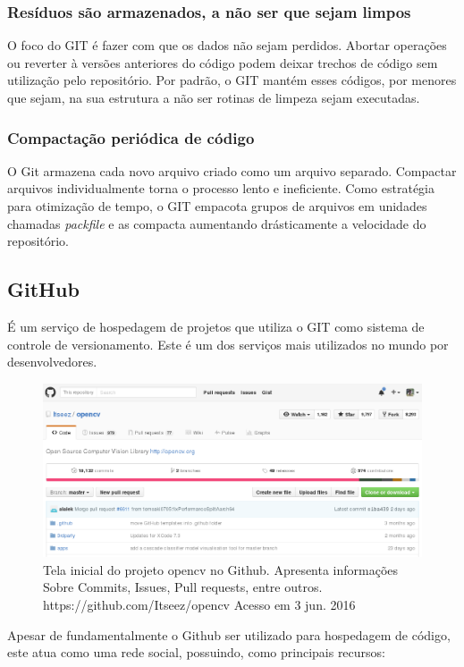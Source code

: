 \documentclass[
	article,			%
	12pt,				%
	oneside,			%
	a4paper,			%
	english,			
	brazil,
	sumario=tradicional
	]{abntex2}
\begin{document}
\subsubsection{Resíduos são armazenados, a não ser que sejam limpos}
O foco do GIT é fazer com que os dados não sejam perdidos. Abortar operações ou reverter à versões anteriores do código podem deixar trechos de código sem utilização pelo repositório. Por padrão, o GIT mantém esses códigos, por menores que sejam, na sua estrutura a não ser rotinas de limpeza sejam executadas.

\subsubsection{Compactação periódica de código}
O Git armazena cada novo arquivo criado como um arquivo separado. Compactar arquivos individualmente torna o processo lento e ineficiente. Como estratégia para otimização de tempo, o GIT empacota grupos de arquivos em unidades chamadas \textit{packfile} e as compacta aumentando drásticamente a velocidade do repositório.


\subsection{GitHub}
É um serviço de hospedagem de projetos que utiliza o GIT como sistema de controle de versionamento. Este é um dos serviços mais utilizados no mundo por desenvolvedores.
\\
\begin{figure}[!h]
\centering
\includegraphics[scale=0.4]{images/github_main.png}
\caption{Tela inicial do projeto opencv no Github. Apresenta informações Sobre Commits, Issues, Pull requests, entre outros. https://github.com/Itseez/opencv Acesso em 3 jun. 2016}
\label{github_main}
\end{figure}

Apesar de fundamentalmente o Github ser utilizado para hospedagem de código, este atua como uma rede social, possuindo, como principais recursos:
\end{document}
